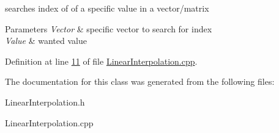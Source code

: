 searches index of of a specific value in a vector/matrix 


\begin{DoxyParams}{Parameters}
{\em Vector} & specific vector to search for index \\
\hline
{\em Value} & wanted value \\
\hline
\end{DoxyParams}


Definition at line \hyperlink{_linear_interpolation_8cpp_source_l00011}{11} of file \hyperlink{_linear_interpolation_8cpp_source}{Linear\+Interpolation.\+cpp}.



The documentation for this class was generated from the following files\+:\begin{DoxyCompactItemize}
\item 
Linear\+Interpolation.\+h\item 
Linear\+Interpolation.\+cpp\end{DoxyCompactItemize}

